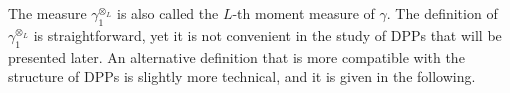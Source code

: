 \documentclass[twoside,11pt]{book}
\numberwithin{theorem}{chapter}
\numberwithin{definition}{chapter}
\numberwithin{proposition}{chapter}
\numberwithin{corollary}{chapter}
\numberwithin{example}{chapter}
\numberwithin{lemma}{chapter}
\numberwithin{assumption}{chapter}
\numberwithin{equation}{chapter}
\numberwithin{figure}{chapter}
\DeclareMathOperator{\EX}{\mathbb{E}}
\begin{document}


The measure $\gamma_{1}^{\otimes_{L}}$ is also called the $L$-th moment measure of $\gamma$. The definition of $\gamma^{\otimes_{L}}_{1}$ is straightforward, yet it is not convenient in the study of DPPs that will be presented later.  
An alternative definition that is more compatible with the structure of DPPs is slightly more technical, and it is given in the following. 
\end{document}

